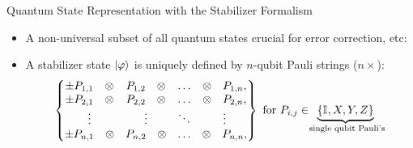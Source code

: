 \begin{refframe}{Quantum State Representation with the
					\alert{Stabilizer Formalism}}


\begin{definition}

\begin{itemize} 
	\item
A non-universal subset of all quantum states \alert{crucial for error correction, etc}: 

\begin{center}
\end{center}

\pause

\item A stabilizer state $\ket{\varphi}$ is uniquely defined by   
			$n$-qubit Pauli strings ($n \times$):
\[
\left\{
\begin{matrix}
\pm P_{1,1}~~~ \otimes & P_{1,2}~~~ \otimes & \dots & \otimes~~~ P_{1,n},\\
\pm P_{2,1}~~~ \otimes& P_{2,2}~~~  \otimes& \dots & \otimes~~~ P_{2,n},\\
\vdots  & \vdots  & \ddots& \vdots\\
\pm P_{n,1}~~~ \otimes& P_{n,2}~~~ \otimes & \dots &  \otimes~~~ P_{n,n},\\
\end{matrix} 
\right\}
\text{ for } P_{i,j} \in \hspace{-.5em} \underbrace{\left\lbrace \mathbb{I}_{}, X, Y, Z \right\rbrace}_{ \text{ single qubit Pauli's}}
\]	
\pause


\end{itemize}
\end{definition}
\end{refframe}
